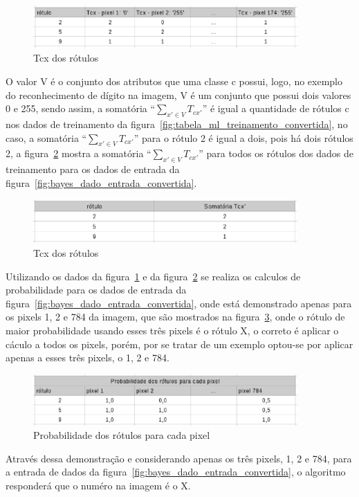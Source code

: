 \begin{figure}[h]
  \centering
  \includegraphics[width=0.9\textwidth]{figuras/tcx_dos_rotulos.eps}
  \caption{Tcx dos rótulos}
  \label{fig:tcx_dos_rotulos}
\end{figure}

O valor V é o conjunto dos atributos que uma classe c possui, logo, no exemplo
do reconhecimento de dígito na imagem, V é um conjunto que possui dois valores
0 e 255, sendo assim, a somatória ``$\sum\limits_{x' \in V}T_{cx'}$'' é igual a
quantidade de rótulos c nos dados de treinamento da figura~\ref{fig:tabela_ml_treinamento_convertida},
no caso, a somatória ``$\sum\limits_{x' \in V}T_{cx'}$'' para o rótulo 2 é igual
a dois, pois há dois rótulos 2, a figura~\ref{fig:somatoria_tcx_dos_rotulos}
mostra a somatória ``$\sum\limits_{x' \in V}T_{cx'}$'' para todos os rótulos dos
dados de treinamento para os dados de entrada da figura~\ref{fig:bayes_dado_entrada_convertida}.

\begin{figure}[h]
  \centering
  \includegraphics[width=0.9\textwidth]{figuras/somatoria_tcx_dos_rotulos.eps}
  \caption{Tcx dos rótulos}
  \label{fig:somatoria_tcx_dos_rotulos}
\end{figure}

Utilizando os dados da figura~\ref{fig:tcx_dos_rotulos} e da figura~\ref{fig:somatoria_tcx_dos_rotulos}
se realiza os calculos de probabilidade para os dados de entrada da
figura~\ref{fig:bayes_dado_entrada_convertida}, onde está demonstrado apenas para
os pixels 1, 2 e 784 da imagem, que são mostrados na figura~\ref{fig:probabilidades_dos_rotulos},
onde o rótulo de maior probabilidade usando esses três pixels é o rótulo X, o
correto é aplicar o cáculo a todos os pixels, porém, por se tratar de um exemplo
optou-se por aplicar apenas a esses três pixels, o 1, 2 e 784.

\begin{figure}[h]
  \centering
  \includegraphics[width=0.9\textwidth]{figuras/probabilidades_dos_rotulos.eps}
  \caption{Probabilidade dos rótulos para cada pixel}
  \label{fig:probabilidades_dos_rotulos}
\end{figure}

Através dessa demonstração e considerando apenas os três pixels, 1, 2 e 784,
para a entrada de dados da figura~\ref{fig:bayes_dado_entrada_convertida}, o
algoritmo responderá que o numéro na imagem é o X.
